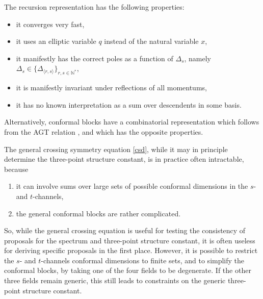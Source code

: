 \documentclass[12pt,a4paper,notitlepage]{report}
\numberwithin{equation}{section}
\theoremstyle{break}
\begin{document}
The recursion representation has the following properties:
\begin{itemize}
 \item it converges very fast,
\item it uses an elliptic variable $q$ instead of the natural variable $x$,
\item it manifestly has the correct poles as a function of $\Delta_s$, namely $\Delta_s \in \{\Delta_{\langle r,s\rangle}\}_{r,s\in {\mathbb{N}}^*}$,
\item it is manifestly invariant under reflections of all momentums,
\item it has no known interpretation as a sum over descendents in some basis.
\end{itemize}
Alternatively, conformal blocks have a combinatorial representation which follows from the AGT relation \cite{aflt10}, and which has the opposite properties. 

The general crossing symmetry equation \eqref{csd}, while it may in principle determine the three-point structure constant, is in practice often intractable, because
\begin{enumerate}
 \item it can involve sums over large sets of possible conformal dimensions in the $s$- and $t$-channels, 
 \item the general conformal blocks are rather complicated. 
\end{enumerate}
So, while the general crossing equation is useful for testing the consistency of proposals for the spectrum and three-point structure constant, it is often useless for deriving specific proposals in the first place. However, it is possible to restrict the $s$- and $t$-channels conformal dimensions to finite sets, and to simplify the conformal blocks, by taking one of the four fields to be degenerate. If the other three fields remain generic, this still leads to constraints on the generic three-point structure constant. 
\end{document}
